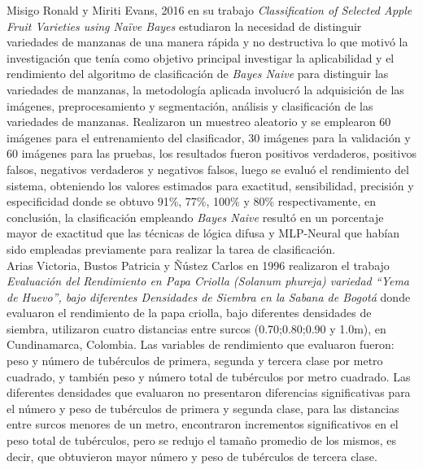 Misigo Ronald y Miriti Evans, 2016 en su trabajo \textit{Classification of Selected Apple Fruit Varieties using Naïve Bayes} estudiaron la necesidad de distinguir variedades de manzanas de una manera rápida y no destructiva lo que motivó la investigación  que tenía como objetivo principal investigar la aplicabilidad y el rendimiento del algoritmo de clasificación de \textit{Bayes Naive} para distinguir las variedades de manzanas, la metodología aplicada involucró la adquisición de las imágenes, preprocesamiento y segmentación, análisis y clasificación de las variedades de manzanas. Realizaron un muestreo aleatorio y se emplearon 60 imágenes para el entrenamiento del clasificador, 30 imágenes para la validación y 60 imágenes para las pruebas, los resultados fueron positivos verdaderos, positivos falsos, negativos verdaderos y negativos falsos, luego se evaluó el rendimiento del sistema, obteniendo los valores estimados para exactitud, sensibilidad, precisión y especificidad donde se obtuvo 91\%, 77\%, 100\% y 80\% respectivamente, en conclusión, la clasificación empleando \textit{Bayes Naive} resultó en un porcentaje mayor de exactitud que las técnicas de lógica difusa y MLP-Neural que habían sido empleadas previamente para realizar la tarea de clasificación.\\

Arias Victoria, Bustos Patricia y Ñústez Carlos en 1996 realizaron el trabajo  \textit{Evaluación del Rendimiento en Papa Criolla (Solanum phureja) variedad "`Yema de Huevo"', bajo diferentes Densidades de Siembra en la Sabana de Bogotá} donde evaluaron el rendimiento de la papa criolla, bajo diferentes densidades de siembra, utilizaron cuatro distancias entre surcos (0.70;0.80;0.90 y 1.0m), en Cundinamarca, Colombia. Las variables de rendimiento que evaluaron fueron: peso y número de tubérculos de primera, segunda y tercera clase por metro cuadrado, y también peso y número total de tubérculos por metro cuadrado. Las diferentes densidades que evaluaron no presentaron diferencias significativas para el número y peso de tubérculos de primera y segunda clase, para las distancias entre surcos menores de un metro, encontraron incrementos significativos en el peso total de tubérculos, pero se redujo el tamaño promedio de los mismos, es decir, que obtuvieron mayor número y peso de tubérculos de tercera clase.\\

